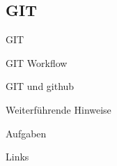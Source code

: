 \documentclass[18pt]{beamer}
\begin{document}
\subsection{GIT}
\begin{frame}{GIT}
\end{frame}

\begin{frame}{GIT Workflow}
\end{frame}

\begin{frame}{GIT und github}
\end{frame}

\begin{frame}{Weiterführende Hinweise}
\end{frame}

\begin{frame}{Aufgaben}
\end{frame}

\appendix
\beginbackup

\begin{frame}[allowframebreaks]{Links}
\end{frame}

\backupend
\end{document}
